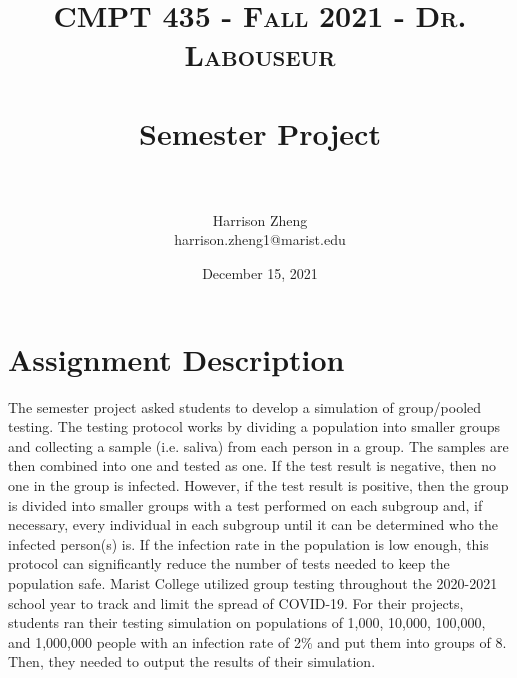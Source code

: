 \documentclass[letterpaper, 10pt,DIV=13]{scrartcl}
\title{	
   \normalfont \normalsize 
   \textsc{CMPT 435 - Fall 2021 - Dr. Labouseur} \\[10pt] %
   \horrule{0.5pt} \\[0.25cm] 	%
   \huge Semester Project  \\     	    %
   \horrule{0.5pt} \\[0.25cm] 	%
}
\author{Harrison Zheng \\ \normalsize harrison.zheng1@marist.edu}
\date{\normalsize December 15, 2021} 	%
\numberwithin{equation}{section} %
\numberwithin{figure}{section} %
\numberwithin{table}{section} %
\begin{document}
\maketitle %

\section{Assignment Description}\label{operations}
The semester project asked students to develop a simulation of group/pooled testing. The testing protocol works by dividing a population into smaller groups and collecting a sample (i.e. saliva) from each person in a group. The samples are then combined into one and tested as one. If the test result is negative, then no one in the group is infected. However, if the test result is positive, then the group is divided into smaller groups with a test performed on each subgroup and, if necessary, every individual in each subgroup until it can be determined who the infected person(s) is. If the infection rate in the population is low enough, this protocol can significantly reduce the number of tests needed to keep the population safe. Marist College utilized group testing throughout the 2020-2021 school year to track and limit the spread of COVID-19. For their projects, students ran their testing simulation on populations of 1,000, 10,000, 100,000, and 1,000,000 people with an infection rate of 2\% and put them into groups of 8. Then, they needed to output the results of their simulation.
\end{document}
